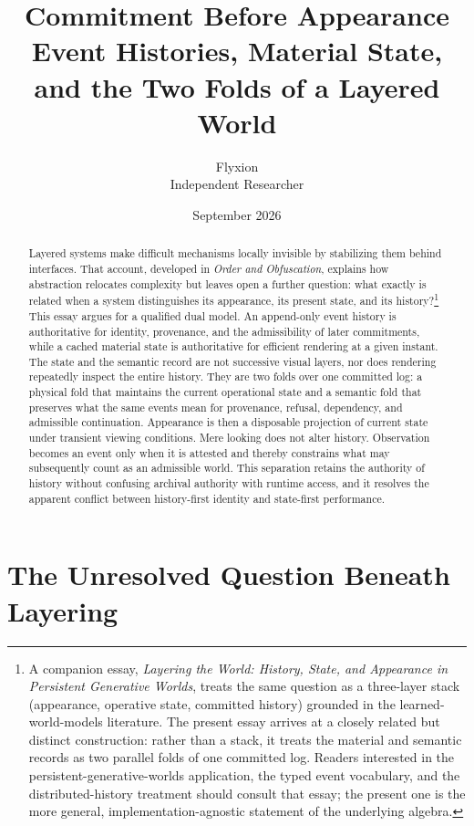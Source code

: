 \documentclass[11pt]{article}
\title{\textbf{Commitment Before Appearance}\\[4pt]
\large Event Histories, Material State, and the Two Folds of a Layered World}
\author{Flyxion\\ \small Independent Researcher}
\date{September 2026}
\begin{document}
\maketitle

\begin{abstract}
\noindent
Layered systems make difficult mechanisms locally invisible by stabilizing them behind interfaces. That account, developed in \emph{Order and Obfuscation}, explains how abstraction relocates complexity but leaves open a further question: what exactly is related when a system distinguishes its appearance, its present state, and its history?\footnote{A companion essay, \emph{Layering the World: History, State, and Appearance in Persistent Generative Worlds}, treats the same question as a three-layer stack (appearance, operative state, committed history) grounded in the learned-world-models literature. The present essay arrives at a closely related but distinct construction: rather than a stack, it treats the material and semantic records as two parallel folds of one committed log. Readers interested in the persistent-generative-worlds application, the typed event vocabulary, and the distributed-history treatment should consult that essay; the present one is the more general, implementation-agnostic statement of the underlying algebra.} This essay argues for a qualified dual model. An append-only event history is authoritative for identity, provenance, and the admissibility of later commitments, while a cached material state is authoritative for efficient rendering at a given instant. The state and the semantic record are not successive visual layers, nor does rendering repeatedly inspect the entire history. They are two folds over one committed log: a physical fold that maintains the current operational state and a semantic fold that preserves what the same events mean for provenance, refusal, dependency, and admissible continuation. Appearance is then a disposable projection of current state under transient viewing conditions. Mere looking does not alter history. Observation becomes an event only when it is attested and thereby constrains what may subsequently count as an admissible world. This separation retains the authority of history without confusing archival authority with runtime access, and it resolves the apparent conflict between history-first identity and state-first performance.
\end{abstract}

\section{The Unresolved Question Beneath Layering}
\end{document}
